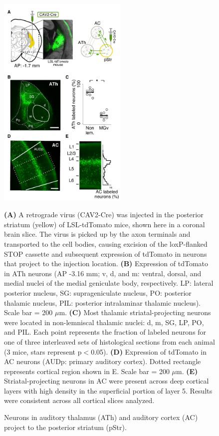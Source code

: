 \begin{figure}[hp]
  \begin{center}
    \includegraphics[height=4.1in]{figures/chapter3/fig1_anatomy}%
  \end{center}
\caption{Neurons in auditory thalamus (ATh) and auditory cortex (AC) project to the posterior striatum (pStr).}{\textbf{(A)} A retrograde virus (CAV2-Cre) was injected in the posterior striatum (yellow) of LSL-tdTomato mice, shown here in a coronal brain slice.  
%
The virus is picked up by the axon terminals and transported to the cell bodies, causing excision of the loxP-flanked STOP cassette and subsequent expression of tdTomato in neurons that project to the injection location. 
%
\textbf{(B)} Expression of tdTomato in ATh neurons (AP -3.16 mm; v, d, and m: ventral, dorsal, and medial nuclei of the medial geniculate body, respectively. LP: lateral posterior nucleus, SG: suprageniculate nucleus, PO: posterior thalamic nucleus, PIL: posterior intralaminar thalamic nucleus).
%
Scale bar = 200 $\mu$m. 
%
\textbf{(C)} Most thalamic striatal-projecting neurons were located in non-lemniscal thalamic nuclei: d, m, SG, LP, PO, and PIL. 
%
Each point represents the fraction of labeled neurons for one of three interleaved sets of histological sections from each animal (3 mice, stars represent p$<$0.05). 
%
\textbf{(D)} Expression of tdTomato in AC neurons (AUDp: primary auditory cortex). 
%
Dotted rectangle represents cortical region shown in E. Scale bar = 200 $\mu$m. 
%
\textbf{(E)} Striatal-projecting neurons in AC were present across deep cortical layers with high density in the superficial portion of layer 5.
%
Results were consistent across all cortical slices analyzed. 
}
\end{figure}


